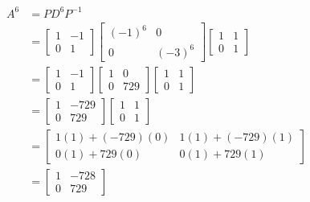 \documentclass{article}
\begin{document}
\begin{align*}
	A^6 & = P D^6 P^{-1}                                                                                                                                      \\
	    & = \begin{bmatrix} 1 & -1 \\ 0 & 1 \end{bmatrix} \begin{bmatrix} (-1)^6 & 0 \\ 0 & (-3)^6 \end{bmatrix} \begin{bmatrix} 1 & 1 \\ 0 & 1 \end{bmatrix} \\
	    & = \begin{bmatrix} 1 & -1 \\ 0 & 1 \end{bmatrix} \begin{bmatrix} 1 & 0 \\ 0 & 729 \end{bmatrix} \begin{bmatrix} 1 & 1 \\ 0 & 1 \end{bmatrix}         \\
	    & = \begin{bmatrix} 1 & -729 \\ 0 & 729 \end{bmatrix} \begin{bmatrix} 1 & 1 \\ 0 & 1 \end{bmatrix}                                                    \\
	    & = \begin{bmatrix} 1(1) + (-729)(0) & 1(1) + (-729)(1) \\ 0(1) + 729(0) & 0(1) + 729(1) \end{bmatrix}                                                \\
	    & = \begin{bmatrix} 1 & -728 \\ 0 & 729 \end{bmatrix}
\end{align*}

\pagebreak

\end{document}

